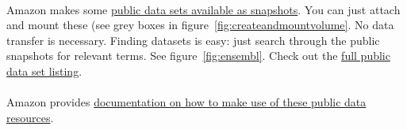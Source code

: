 \paragraph{}Amazon makes some \href{http://aws.amazon.com/publicdatasets/}{public data sets available as snapshots}. You can just attach and mount these (see grey boxes in figure~\ref{fig:createandmountvolume}. No data transfer is necessary. Finding datasets is easy: just search through the public snapshots for relevant terms. See figure~\ref{fig:ensembl}. Check out the \href{http://developer.amazonwebservices.com/connect/kbcategory.jspa?categoryID=243}{full public data set listing}. 

\paragraph{}Amazon provides \href{http://docs.amazonwebservices.com/AWSEC2/latest/UserGuide/using-public-data-sets.html}{documentation on how to make use of these public data resources}.


\paragraph{}




